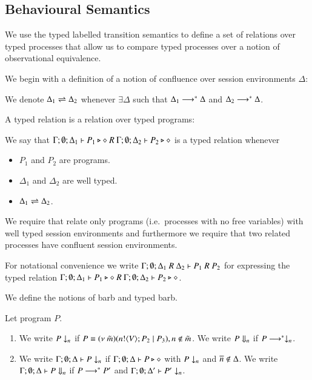 \subsection{Behavioural Semantics}

We use the typed labelled transition semantics to define
a set of relations over typed processes that allow us to compare
typed processes over a notion of observational equivalence.


We begin with a definition of a notion of confluence
over session environments $\Delta$:
\begin{definition}\rm
	We denote $\Delta_1 \rightleftharpoons \Delta_2$ whenever $\exists \Delta$ such that
	$\Delta_1 \longrightarrow^* \Delta$ and $\Delta_2 \longrightarrow^* \Delta$.
\end{definition}


A typed relation is a relation over typed programs:

\begin{definition}\rm
	We say that
	$\Gamma; \emptyset; \Delta_1 \vdash P_1 \triangleright \diamond\ R\ \Gamma; \emptyset; \Delta_2 \vdash P_2 \triangleright \diamond$
	is a typed relation whenever
	\begin{itemize}
		\item	$P_1$ and $P_2$ are programs.
		\item	$\Delta_1$ and $\Delta_2$ are well typed.
		\item	$\Delta_1 \rightleftharpoons \Delta_2$.
	\end{itemize}
\end{definition}

We require that relate only programs (i.e.\ processes with no free variables) with
well typed session environments and furthermore we require that two related processes
have confluent session environments.

For notational convenience we write $\Gamma; \emptyset; \Delta_1\ R\ \Delta_2 \vdash P_1\ R\ P_2$
for expressing the typed relation $\Gamma; \emptyset; \Delta_1 \vdash P_1 \triangleright \diamond\ R\ \Gamma; \emptyset; \Delta_2 \vdash P_2 \triangleright \diamond$.

We define the notions of barb and typed barb.

\begin{definition}[Barbs]\rm
	Let program $P$.
	\begin{enumerate}
		\item	We write $P \downarrow_{n}$ if $P \equiv (\nu\ \tilde{m})(n ! \langle V \rangle ; P_2 \;|\; P_3), n \notin \tilde{m}$.
			We write $P \Downarrow_{n}$ if $P \longrightarrow^* \downarrow_{n}$.

		\item	We write $\Gamma; \emptyset; \Delta \vdash P \downarrow_{n}$ if
			$\Gamma; \emptyset; \Delta \vdash P \triangleright \diamond$ with $P \downarrow_{n}$ and $\overline{n} \notin \Delta$.
			We write $\Gamma; \emptyset; \Delta \vdash P \Downarrow_{n}$ if $P \longrightarrow^* P'$ and
			$\Gamma; \emptyset; \Delta' \vdash P' \downarrow_{n}$.			
	\end{enumerate}
\end{definition}

